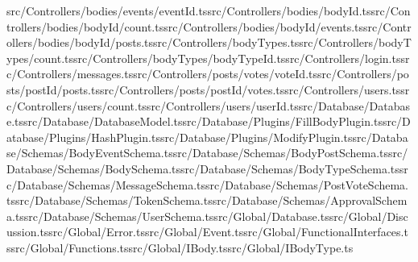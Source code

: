 \documentclass[a4paper,12pt]{article}
\begin{document}
src/Controllers/bodies/events/{eventId}.ts\newline src/Controllers/bodies/{bodyId}.ts\newline src/Controllers/bodies/{bodyId}/count.ts\newline src/Controllers/bodies/{bodyId}/events.ts\newline src/Controllers/bodies/{bodyId}/posts.ts\newline src/Controllers/bodyTypes.ts\newline src/Controllers/bodyTypes/count.ts\newline src/Controllers/bodyTypes/{bodyTypeId}.ts\newline src/Controllers/login.ts\newline src/Controllers/messages.ts\newline src/Controllers/posts/votes/{voteId}.ts\newline src/Controllers/posts/{postId}/posts.ts\newline src/Controllers/posts/{postId}/votes.ts\newline src/Controllers/users.ts\newline src/Controllers/users/count.ts\newline src/Controllers/users/{userId}.ts\newline src/Database/Database.ts\newline src/Database/DatabaseModel.ts\newline src/Database/Plugins/FillBodyPlugin.ts\newline src/Database/Plugins/HashPlugin.ts\newline src/Database/Plugins/ModifyPlugin.ts\newline src/Database/Schemas/BodyEventSchema.ts\newline src/Database/Schemas/BodyPostSchema.ts\newline src/Database/Schemas/BodySchema.ts\newline src/Database/Schemas/BodyTypeSchema.ts\newline src/Database/Schemas/MessageSchema.ts\newline src/Database/Schemas/PostVoteSchema.ts\newline src/Database/Schemas/TokenSchema.ts\newline src/Database/Schemas/ApprovalSchema.ts\newline src/Database/Schemas/UserSchema.ts\newline src/Global/Database.ts\newline src/Global/Discussion.ts\newline src/Global/Error.ts\newline src/Global/Event.ts\newline src/Global/FunctionalInterfaces.ts\newline src/Global/Functions.ts\newline src/Global/IBody.ts\newline src/Global/IBodyType.ts\newline 
\end{document}

